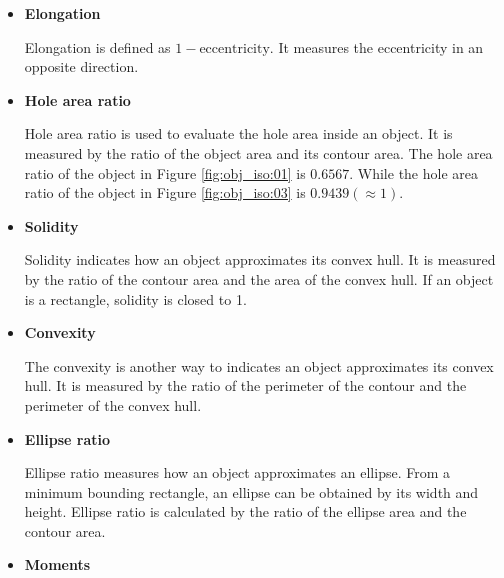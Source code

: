\documentclass[paper=a4, fontsize=11pt]{scrartcl}
\begin{document}
\begin{itemize}
\item \textbf{Elongation}

Elongation is defined as $ 1 - \mbox{eccentricity} $.
It measures the eccentricity in an opposite direction.

\item \textbf{Hole area ratio}

Hole area ratio is used to evaluate the hole area inside an object.
It is measured by the ratio of the object area and its contour area.
The hole area ratio of the object in Figure \ref{fig:obj_iso:01} is $ 0.6567 $.
While the hole area ratio of the object in Figure \ref{fig:obj_iso:03} is $ 0.9439 ( \approx 1 ) $.

\item \textbf{Solidity}

Solidity indicates how an object approximates its convex hull.
It is measured by the ratio of the contour area and the area of the convex hull.
If an object is a rectangle, solidity is closed to 1.

\item \textbf{Convexity}

The convexity is another way to indicates an object approximates its convex hull.
It is measured by the ratio of the perimeter of the contour and the perimeter of the convex hull.

\item \textbf{Ellipse ratio}

Ellipse ratio measures how an object approximates an ellipse.
From a minimum bounding rectangle, an ellipse can be obtained by its width and height.
Ellipse ratio is calculated by the ratio of the ellipse area and the contour area. 

\item \textbf{Moments}


\end{itemize}
\end{document}
